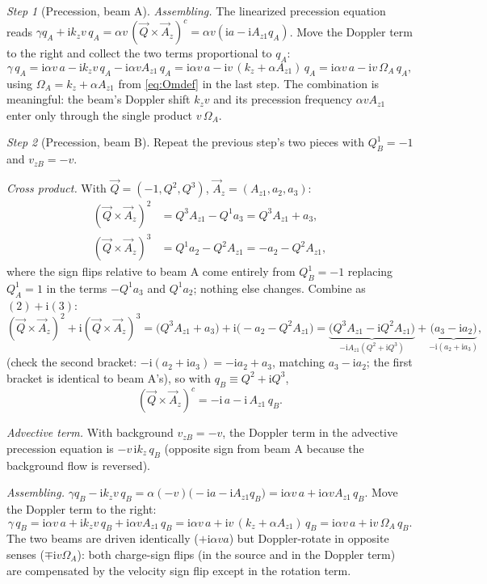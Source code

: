 \documentclass[11pt,a4paper]{article}
\numberwithin{equation}{section}
\theoremstyle{remark}
\newtheorem{step}{Step}[subsection]
\newcommand{\kz}{k_z}
\newcommand{\OmA}{\Omega_A}
\newcommand{\Az}{A_{z1}}
\newcommand{\ii}{\mathrm{i}}
\begin{document}
\begin{step}[Precession, beam A]
\emph{Assembling.} The linearized precession equation reads
$\gamma q_A+\ii\kz v\,q_A=\alpha v\,(\vec Q\times\vec A_z)^c
=\alpha v(\ii a-\ii\Az q_A)$. Move the Doppler term to the right and
collect the two terms proportional to $q_A$:
\begin{equation}
\gamma\,q_A=\ii\alpha v\,a-\ii\kz v\,q_A-\ii\alpha v\Az\,q_A
=\ii\alpha v\,a-\ii v\,(\kz+\alpha\Az)\,q_A
=\ii\alpha v\,a-\ii v\,\OmA\,q_A ,
\label{eq:lin-qA}
\end{equation}
using $\OmA=\kz+\alpha\Az$ from \eqref{eq:Omdef} in the last step. The
combination is meaningful: the beam's Doppler shift $\kz v$ and its
precession frequency $\alpha v\Az$ enter only through the single product
$v\,\OmA$.
\end{step}

\begin{step}[Precession, beam B]
Repeat the previous step's two pieces with $Q^1_B=-1$ and $v_{zB}=-v$.

\emph{Cross product.} With $\vec Q=(-1,Q^2,Q^3)$, $\vec A_z=
(\Az,a_2,a_3)$:
\begin{align}
(\vec Q\times\vec A_z)^2&=Q^3\Az-Q^1a_3=Q^3\Az+a_3 ,\\
(\vec Q\times\vec A_z)^3&=Q^1a_2-Q^2\Az=-a_2-Q^2\Az ,
\end{align}
where the sign flips relative to beam A come entirely from $Q^1_B=-1$
replacing $Q^1_A=1$ in the terms $-Q^1a_3$ and $Q^1a_2$; nothing else
changes. Combine as $(2)+\ii(3)$:
\begin{equation}
(\vec Q\times\vec A_z)^2+\ii(\vec Q\times\vec A_z)^3
=\bigl(Q^3\Az+a_3\bigr)+\ii\bigl(-a_2-Q^2\Az\bigr)
=\underbrace{\bigl(Q^3\Az-\ii Q^2\Az\bigr)}_{-\ii\Az(Q^2+\ii Q^3)}
+\underbrace{\bigl(a_3-\ii a_2\bigr)}_{-\ii(a_2+\ii a_3)} ,
\end{equation}
(check the second bracket: $-\ii(a_2+\ii a_3)=-\ii a_2+a_3$, matching
$a_3-\ii a_2$; the first bracket is identical to beam A's), so with
$q_B\equiv Q^2+\ii Q^3$,
\begin{equation}
(\vec Q\times\vec A_z)^c=-\ii\,a-\ii\,\Az\,q_B .
\end{equation}

\emph{Advective term.} With background $v_{zB}=-v$, the Doppler term in
the advective precession equation is $-v\,\ii\kz\,q_B$ (opposite sign
from beam A because the background flow is reversed).

\emph{Assembling.} $\gamma q_B-\ii\kz v\,q_B=\alpha(-v)\bigl(-\ii a
-\ii\Az q_B\bigr)=\ii\alpha v\,a+\ii\alpha v\Az\,q_B$. Move the Doppler
term to the right:
\begin{equation}
\gamma\,q_B=\ii\alpha v\,a+\ii\kz v\,q_B+\ii\alpha v\Az\,q_B
=\ii\alpha v\,a+\ii v\,(\kz+\alpha\Az)\,q_B
=\ii\alpha v\,a+\ii v\,\OmA\,q_B .
\label{eq:lin-qB}
\end{equation}
The two beams are driven identically ($+\ii\alpha v a$) but Doppler-rotate
in opposite senses ($\mp\ii v\OmA$): both charge-sign flips (in the source
and in the Doppler term) are compensated by the velocity sign flip except
in the rotation term.
\end{step}
\end{document}
